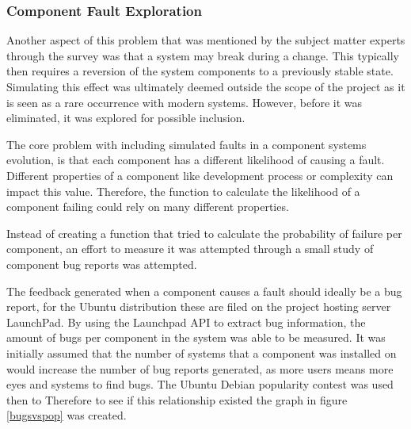 \subsubsection{Component Fault Exploration}
Another aspect of this problem that was mentioned by the subject matter experts through the survey was that a system may break during a change.
This typically then requires a reversion of the system components to a previously stable state.
Simulating this effect was ultimately deemed outside the scope of the project as it is seen as a rare occurrence with modern systems.
However, before it was eliminated, it was explored for possible inclusion.

The core problem with including simulated faults in a component systems evolution, is that each component has a different likelihood of causing a fault.
Different properties of a component like development process or complexity can impact this value.
Therefore, the function to calculate the likelihood of a component failing could rely on many different properties.

Instead of creating a function that tried to calculate the probability of failure per component,
an effort to measure it was attempted through a small study of component bug reports was attempted.

The feedback generated when a component causes a fault should ideally be a bug report, for the Ubuntu distribution these are filed on the project hosting server LaunchPad.
By using the Launchpad API to extract bug information, the amount of bugs per component in the system was able to be measured.
It was initially assumed that the number of systems that a component was installed on would increase the number of bug reports generated,
as more users means more eyes and systems to find bugs.
The Ubuntu Debian popularity contest was used then to  
Therefore to see if this relationship existed the graph in figure \ref{bugsvspop} was created.

